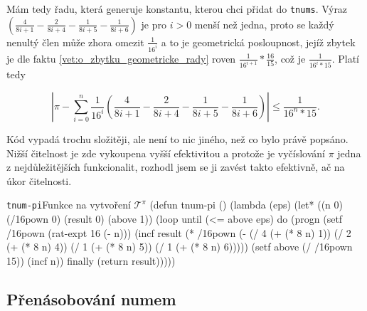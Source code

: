 Mám tedy řadu, která generuje konstantu, kterou chci přidat do \texttt{tnums}. Výraz $\left(\frac{4}{8i+1}-\frac{2}{8i+4}-\frac{1}{8i+5}-\frac{1}{8i+6}\right)$ je pro $i>0$ menší než jedna, proto se každý nenultý člen může zhora omezit $\frac{1}{16^i}$ a to je geometrická posloupnost, jejíž zbytek je dle faktu \ref{vet:o_zbytku_geometricke_rady} roven $\frac{1}{16^{i+1}}*\frac{16}{15}$, což je $\frac{1}{16^i*15}$. Platí tedy

\begin{equation}
\left|\pi - \sum_{i=0}^n\frac{1}{16^i}\left(\frac{4}{8i+1}-\frac{2}{8i+4}-\frac{1}{8i+5}-\frac{1}{8i+6}\right) \right| \leq \frac{1}{16^n*15}.
\end{equation}

Kód vypadá trochu složitěji, ale není to nic jiného, než co bylo právě popsáno. Nižší čitelnost je zde vykoupena vyšší efektivitou a protože je vyčíslování $\pi$ jedna z nejdůležitějších funkcionalit, rozhodl jsem se ji zavést takto efektivně, ač na úkor čitelnosti.

\begin{lispcode}{\texttt{tnum-pi}}{Funkce na vytvoření $\mathcal{T}^\pi$}
(\textcolor{funkcionalni}{defun} \textcolor{pojmenovan}{tnum-pi} ()
  (\textcolor{funkcionalni}{lambda} (eps)
    (\textcolor{vedlejsi}{let*} ((n 0) (/16pown 0) (result 0) (above 1))
      (\textcolor{funkcionalni}{loop} 
        \textcolor{obarvi}{until} (\textcolor{matematicke}{<=} above eps)
        \textcolor{obarvi}{do} (\textcolor{funkcionalni}{progn} 
          (\textcolor{vedlejsi}{setf} /16pown (\textcolor{moje}{rat-expt} 16 (\textcolor{matematicke}{-} n)))
          (\textcolor{vedlejsi}{incf} result
            (\textcolor{matematicke}{*} /16pown
              (\textcolor{matematicke}{-} (\textcolor{matematicke}{/} 4 (\textcolor{matematicke}{+} (\textcolor{matematicke}{*} 8 n) 1))
                (\textcolor{matematicke}{/} 2 (\textcolor{matematicke}{+} (\textcolor{matematicke}{*} 8 n) 4))
                (\textcolor{matematicke}{/} 1 (\textcolor{matematicke}{+} (\textcolor{matematicke}{*} 8 n) 5))
                (\textcolor{matematicke}{/} 1 (\textcolor{matematicke}{+} (\textcolor{matematicke}{*} 8 n) 6)))))
          (\textcolor{vedlejsi}{setf} above (\textcolor{matematicke}{/} /16pown 15))
          (\textcolor{vedlejsi}{incf} n))
        \textcolor{obarvi}{finally} (\textcolor{funkcionalni}{return} result)))))
\end{lispcode}

\subsection{Přenásobování numem}

